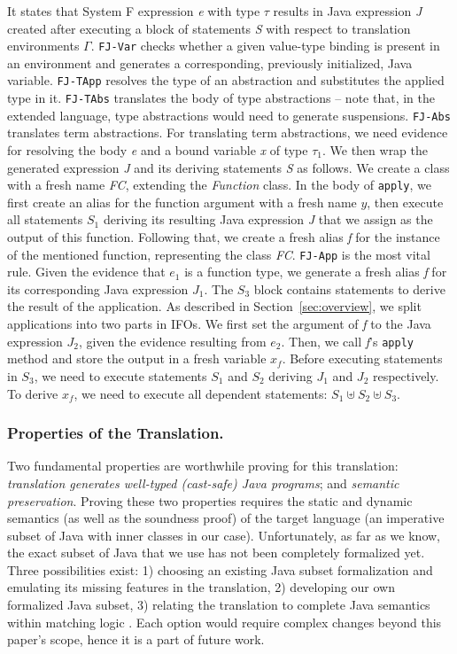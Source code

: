 \noindent It states that System F expression \emph{e} with type
$\tau$ results in Java expression \emph{J} created after executing a
block of statements \emph{S} with respect to translation environments
$\Gamma$. \texttt{FJ-Var} checks whether a given value-type binding
is present in an environment and generates a corresponding, previously initialized,
Java variable. \texttt{FJ-TApp} resolves the type of an abstraction and substitutes 
the applied type in it. \texttt{FJ-TAbs} translates the body of type abstractions --
note that, in the extended language, type abstractions would need to generate suspensions. 
\texttt{FJ-Abs} translates term abstractions. For translating term abstractions, we need evidence for resolving
the body \emph{e} and a bound variable \emph{x} of type $\tau_1$.
We then wrap the generated expression \emph{J} and its deriving statements
\emph{S} as follows. We create a class with a fresh name
\emph{FC}, extending the \emph{Function} class. 
In the body of \lstinline{apply}, we first create an alias for the function argument with a
fresh name $y$, then execute all statements $S_1$ deriving its
resulting Java expression \emph{J} that we assign as the output of
this function. 
Following that, we create a fresh alias \emph{f} for the
instance of the mentioned function, representing the class
\emph{FC}.
\texttt{FJ-App} is the most vital rule. Given the evidence that
$e_1$ is a function type, we generate a fresh
alias \emph{f} for its corresponding Java expression $J_1$. The $S_3$
block contains statements to derive the result of the
application. As described in Section~\ref{sec:overview}, we split applications into
two parts in IFOs. We first set the argument of \emph{f} to the Java
expression $J_2$, given the evidence resulting from $e_2$. Then,
we call \emph{f}'s \lstinline{apply} method and store the output in a fresh
variable $x_f$. Before executing statements in $S_3$, we need to
execute statements $S_1$ and $S_2$ deriving $J_1$ and $J_2$ respectively. 
To derive $x_f$, we need to execute all
dependent statements: $S_1 \uplus S_2 \uplus S_3$.

\subsubsection{Properties of the Translation.}
Two fundamental properties are worthwhile proving for
this translation: \emph{translation generates well-typed (cast-safe) Java programs}; and \emph{semantic preservation}.
Proving these two properties requires the static and dynamic semantics
(as well as the soundness proof) of the target language (an imperative subset of
Java with inner classes in our case). Unfortunately, as far as we know, the exact subset of
Java that we use has not been completely formalized yet. Three possibilities exist: 1) choosing an existing Java subset formalization and emulating its missing features in the translation, 2) developing our own formalized Java subset, 3) relating the translation to complete Java semantics within matching logic \cite{Bogdanas2015}. Each option would require complex changes beyond this paper's scope, hence it is a part of future work.
